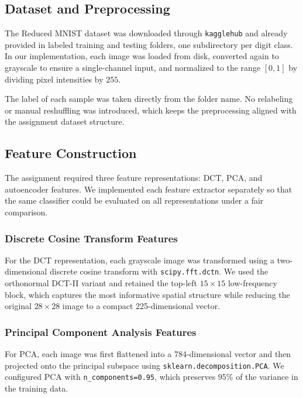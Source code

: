 \begingroup
\graphicspath{{../prob_1/Figures/}}


\subsection{Dataset and Preprocessing}
The Reduced MNIST dataset was downloaded through \texttt{kagglehub} and already provided in labeled training and testing folders, one subdirectory per digit class. In our implementation, each image was loaded from disk, converted again to grayscale to ensure a single-channel input, and normalized to the range $[0,1]$ by dividing pixel intensities by $255$.

The label of each sample was taken directly from the folder name. No relabeling or manual reshuffling was introduced, which keeps the preprocessing aligned with the assignment dataset structure.

\subsection{Feature Construction}
The assignment required three feature representations: DCT, PCA, and autoencoder features. We implemented each feature extractor separately so that the same classifier could be evaluated on all representations under a fair comparison.

\subsubsection{Discrete Cosine Transform Features}
For the DCT representation, each grayscale image was transformed using a two-dimensional discrete cosine transform with \texttt{scipy.fft.dctn}. We used the orthonormal DCT-II variant and retained the top-left $15\times15$ low-frequency block, which captures the most informative spatial structure while reducing the original $28\times28$ image to a compact 225-dimensional vector.

\subsubsection{Principal Component Analysis Features}
For PCA, each image was first flattened into a 784-dimensional vector and then projected onto the principal subspace using \texttt{sklearn.decomposition.PCA}. We configured PCA with \texttt{n\_components=0.95}, which preserves 95\% of the variance in the training data.

